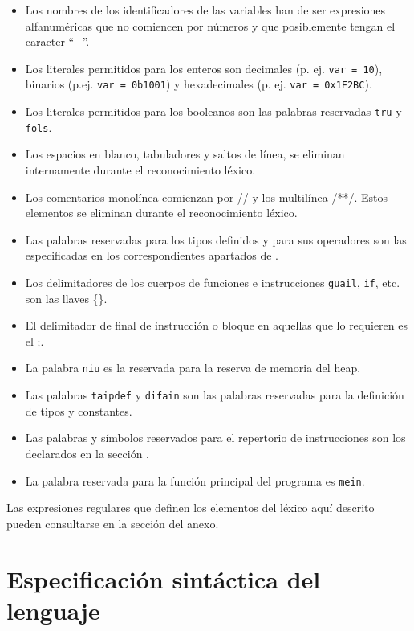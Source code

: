 \documentclass[10pt,a4paper]{article}
\begin{document}
\begin{itemize}
    \item Los nombres de los identificadores de las variables han de ser expresiones alfanuméricas que no comiencen por números y que posiblemente tengan el caracter ``\_''.
    \item Los literales permitidos para los enteros son decimales (p. ej. \texttt{var = 10}), binarios (p.ej. \texttt{var = 0b1001}) y hexadecimales (p. ej. \texttt{var = 0x1F2BC}).
    \item Los literales permitidos para los booleanos son las palabras reservadas \texttt{tru} y \texttt{fols}.
    \item Los espacios en blanco, tabuladores y saltos de línea, se eliminan internamente durante el reconocimiento léxico.
    \item Los comentarios monolínea comienzan por // y los multilínea /**/. Estos elementos se eliminan durante el reconocimiento léxico.
    \item Las palabras reservadas para los tipos definidos y para sus operadores son las especificadas en los correspondientes apartados de .
    \item Los delimitadores de los cuerpos de funciones e instrucciones \texttt{guail}, \texttt{if}, etc. son las llaves \{\}.
    \item El delimitador de final de instrucción o bloque en aquellas que lo requieren es el ;.
    \item La palabra \texttt{niu} es la reservada para la reserva de memoria del heap.
    \item Las palabras \texttt{taipdef} y \texttt{difain} son las palabras reservadas para la definición de tipos y constantes.
    \item Las palabras y símbolos reservados para el repertorio de instrucciones son los declarados en la sección .
    \item La palabra reservada para la función principal del programa es \texttt{mein}.
\end{itemize}

Las expresiones regulares que definen los elementos del léxico aquí descrito pueden consultarse en la sección \nameref{} del anexo.

\section{Especificación sintáctica del lenguaje}\label{sec:Especificación sintáctica del lenguaje}
\end{document}

